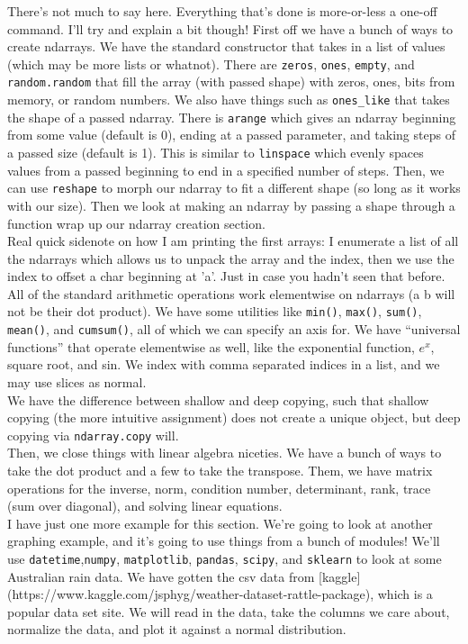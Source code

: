 \documentclass[12pt]{article}
\begin{document}
There's not much to say here. Everything that's done is more-or-less a one-off command. I'll try and explain a bit though! First off we have a bunch of ways to create ndarrays. We have the standard constructor that takes in a list of values (which may be more lists or whatnot). There are \texttt{zeros}, \texttt{ones}, \texttt{empty}, and \texttt{random.random} that fill the array (with passed shape) with zeros, ones, bits from memory, or random numbers. We also have things such as \texttt{ones\_like} that takes the shape of a passed ndarray. There is \texttt{arange} which gives an ndarray beginning from some value (default is 0), ending at a passed parameter, and taking steps of a passed size (default is 1). This is similar to \texttt{linspace} which evenly spaces values from a passed beginning to end in a specified number of steps. Then, we can use \texttt{reshape} to morph our ndarray to fit a different shape (so long as it works with our size). Then we look at making an ndarray by passing a shape through a function wrap up our ndarray creation section.\\
Real quick sidenote on how I am printing the first arrays: I enumerate a list of all the ndarrays which allows us to unpack the array and the index, then we use the index to offset a char beginning at 'a'. Just in case you hadn't seen that before.\\
All of the standard arithmetic operations work elementwise on ndarrays (a \textit{} b will not be their dot product). We have some utilities like \texttt{min()}, \texttt{max()}, \texttt{sum()}, \texttt{mean()}, and \texttt{cumsum()}, all of which we can specify an axis for. We have ``universal functions'' that operate elementwise as well, like the exponential function, $e^x$, square root, and sin. We index with comma separated indices in a list, and we may use slices as normal.\\
We have the difference between shallow and deep copying, such that shallow copying (the more intuitive assignment) does not create a unique object, but deep copying via \texttt{ndarray.copy} will.\\
Then, we close things with linear algebra niceties. We have a bunch of ways to take the dot product and a few to take the transpose. Them, we have matrix operations for the inverse, norm, condition number, determinant, rank, trace (sum over diagonal), and solving linear equations.\\
I have just one more example for this section. We're going to look at another graphing example, and it's going to use things from a bunch of modules! We'll use \texttt{datetime},\texttt{numpy}, \texttt{matplotlib}, \texttt{pandas}, \texttt{scipy}, and \texttt{sklearn} to look at some Australian rain data. We have gotten the csv data from [kaggle](https://www.kaggle.com/jsphyg/weather-dataset-rattle-package), which is a popular data set site. We will read in the data, take the columns we care about, normalize the data, and plot it against a normal distribution.\\
\end{document}
